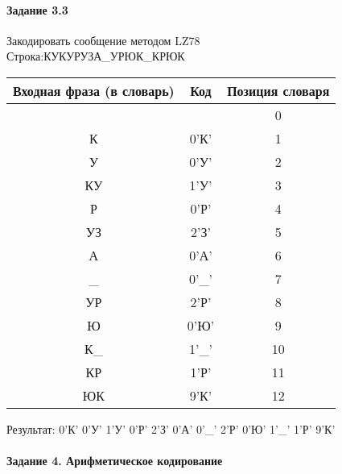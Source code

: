 \documentclass[a4paper, 12pt]{article}
\begin{document}
\paragraph{Задание 3.3}

Закодировать сообщение методом LZ78\\
Строка:КУКУРУЗА\_УРЮК\_КРЮК\\
\begin{table}[h!]
\centering
\begin{tabular}{|c|c|c|} 
\hline
 Входная фраза (в словарь) & Код & Позиция словаря \\ \hline

 &  & 0 \\ \hline
К & 0'К' & 1 \\ \hline
У & 0'У' & 2 \\ \hline
КУ & 1'У' & 3 \\ \hline
Р & 0'Р' & 4 \\ \hline
УЗ & 2'З' & 5 \\ \hline
А & 0'А' & 6 \\ \hline
\_ & 0'\_' & 7 \\ \hline
УР & 2'Р' & 8 \\ \hline
Ю & 0'Ю' & 9 \\ \hline
К\_ & 1'\_' & 10 \\ \hline
КР & 1'Р' & 11 \\ \hline
ЮК & 9'К' & 12 \\ \hline
\end{tabular}
\end{table}

Результат: 0'К' 0'У' 1'У' 0'Р' 2'З' 0'А' 0'\_' 2'Р' 0'Ю' 1'\_' 1'Р' 9'К'\\
\pagebreak
\paragraph{Задание 4. Арифметическое кодирование\\}
\end{document}

